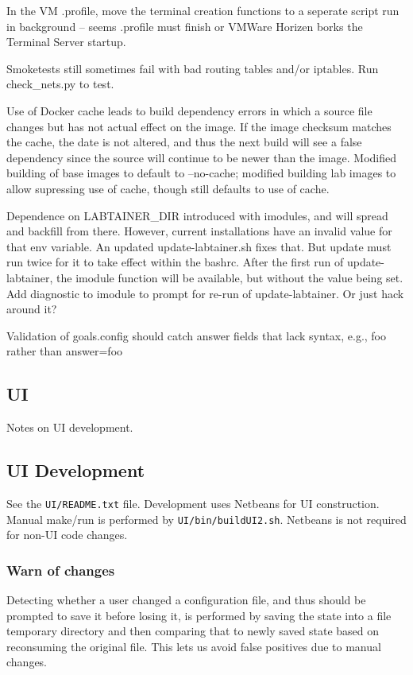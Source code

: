 \documentclass[12pt]{article}
\begin{document}
In the VM .profile, move the terminal creation functions to a seperate script run in background -- seems .profile must finish or VMWare Horizen 
borks the Terminal Server startup.

Smoketests still sometimes fail with bad routing tables and/or iptables.  Run check\_nets.py to test.

Use of Docker cache leads to build dependency errors in which a source file changes but has not actual effect on the image.  If the image
checksum matches the cache, the date is not altered, and thus the next build will see a false dependency since the source will continue to
be newer than the image.  Modified building of base images to default to --no-cache; modified building lab images to allow supressing use of cache,
though still defaults to use of cache.

Dependence on LABTAINER\_DIR introduced with imodules, and will spread and backfill from there.  However, current installations have an invalid
value for that env variable.  An updated update-labtainer.sh fixes that.  But update must run twice for it to take effect within the bashrc.
After the first run of update-labtainer, the imodule function will be available, but without the value being set.  Add diagnostic to imodule to
prompt for re-run of update-labtainer.  Or just hack around it?

Validation of goals.config should catch answer fields that lack syntax, e.g., foo rather than answer=foo

\subsection {UI}
Notes on UI development.  
\subsection{UI Development}
See the {\tt UI/README.txt} file.  Development uses Netbeans for UI construction.  Manual make/run is performed by
{\tt UI/bin/buildUI2.sh}.  Netbeans is not required for non-UI code changes.  
\subsubsection{Warn of changes}
Detecting whether a user changed a configuration file, and thus should be prompted to save it before losing it,
is performed by saving the state into a file temporary directory and then comparing that to newly saved state based
on reconsuming the original file.  This lets us avoid false positives due to manual changes.
\end{document}
